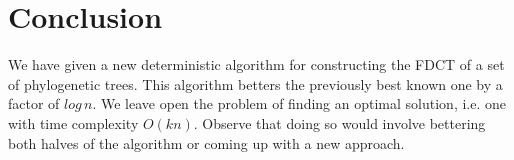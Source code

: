 \documentclass[12pt,a4paper]{article}
\begin{document}
    \section{Conclusion}
    We have given a new deterministic algorithm for constructing the FDCT of a set of phylogenetic trees. This algorithm betters the previously best known one by a factor of $log\,n$. We leave open the problem of finding an optimal solution, i.e. one with time complexity $O(kn)$. Observe that doing so would involve bettering both halves of the algorithm or coming up with a new approach.

    \newpage
    
    
\end{document}
